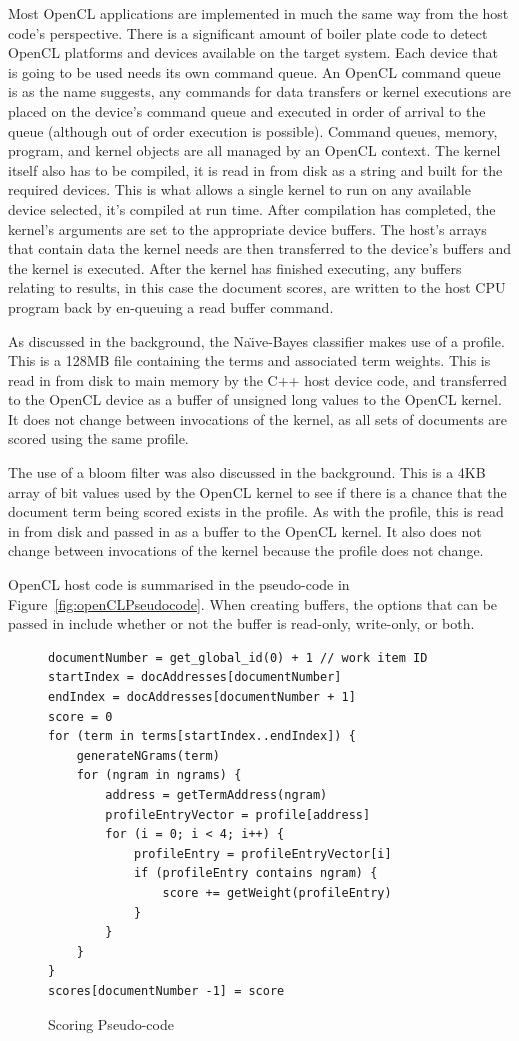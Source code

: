 Most OpenCL applications are implemented in much the same way from the host
code's perspective. There is a significant amount of boiler plate code to detect
OpenCL platforms and devices available on the target system. Each device that is
going to be used needs its own command queue. An OpenCL command queue is as the
name suggests, any commands for data transfers or kernel executions are placed
on the device's command queue and executed in order of arrival to the queue
(although out of order execution is possible). Command queues, memory, program,
and kernel objects are all managed by an OpenCL context. The kernel itself also
has to be compiled, it is read in from disk as a string and built for the
required devices. This is what allows a single kernel to run on any available
device selected, it's compiled at run time. After compilation has completed, the
kernel's arguments are set to the appropriate device buffers. The host's arrays
that contain data the kernel needs are then transferred to the device's buffers
and the kernel is executed. After the kernel has finished executing, any buffers
relating to results, in this case the document scores, are written to the host
CPU program back by en-queuing a read buffer command.

As discussed in the background, the Na{\"{\i}}ve-Bayes classifier makes use of a
profile. This is a 128MB file containing the terms and associated term weights.
This is read in from disk to main memory by the C++ host device code, and
transferred to the OpenCL device as a buffer of unsigned long values to the
OpenCL kernel. It does not change between invocations of the kernel, as all sets
of documents are scored using the same profile.

The use of a bloom filter was also discussed in the background. This is a 4KB
array of bit values used by the OpenCL kernel to see if there is a chance that
the document term being scored exists in the profile. As with the profile, this
is read in from disk and passed in as a buffer to the OpenCL kernel. It also
does not change between invocations of the kernel because the profile does not
change.

OpenCL host code is summarised in the pseudo-code in
Figure~\ref{fig:openCLPseudocode}. When creating buffers, the options that can be
passed in include whether or not the buffer is read-only, write-only, or both.

\begin{figure}[H]
\small\begin{verbatim}
documentNumber = get_global_id(0) + 1 // work item ID
startIndex = docAddresses[documentNumber]
endIndex = docAddresses[documentNumber + 1]
score = 0
for (term in terms[startIndex..endIndex]) {
    generateNGrams(term)
    for (ngram in ngrams) {
        address = getTermAddress(ngram)
        profileEntryVector = profile[address]
        for (i = 0; i < 4; i++) {
            profileEntry = profileEntryVector[i]
            if (profileEntry contains ngram) {
                score += getWeight(profileEntry)
            }
        }
    }
}
scores[documentNumber -1] = score
\end{verbatim}
\caption{Scoring Pseudo-code}
\label{fig:scoringPseudocode}
\end{figure}

